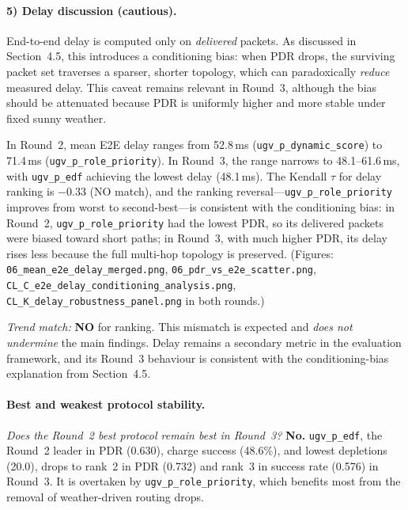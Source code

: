 \paragraph{5) Delay discussion (cautious).}

End-to-end delay is computed only on \emph{delivered} packets.  As
discussed in Section~4.5, this introduces a conditioning bias: when
PDR drops, the surviving packet set traverses a sparser, shorter
topology, which can paradoxically \emph{reduce} measured delay.  This
caveat remains relevant in Round~3, although the bias should be
attenuated because PDR is uniformly higher and more stable under
fixed sunny weather.

In Round~2, mean E2E delay ranges from 52.8\,ms
(\texttt{ugv\_p\_dynamic\_score}) to 71.4\,ms
(\texttt{ugv\_p\_role\_priority}).  In Round~3, the range narrows to
48.1--61.6\,ms, with \texttt{ugv\_p\_edf} achieving the lowest delay
(48.1\,ms).  The Kendall $\tau$ for delay ranking is $-0.33$ (NO
match), and the ranking reversal---\texttt{ugv\_p\_role\_priority}
improves from worst to second-best---is consistent with the
conditioning bias: in Round~2, \texttt{ugv\_p\_role\_priority} had
the lowest PDR, so its delivered packets were biased toward short
paths; in Round~3, with much higher PDR, its delay rises less because
the full multi-hop topology is preserved.
(Figures: \texttt{06\_mean\_e2e\_delay\_merged.png},
\texttt{06\_pdr\_vs\_e2e\_scatter.png},
\texttt{CL\_C\_e2e\_delay\_conditioning\_analysis.png},
\texttt{CL\_K\_delay\_robustness\_panel.png} in both rounds.)

\emph{Trend match:} \textbf{NO} for ranking.
This mismatch is expected and \emph{does not undermine} the main
findings.  Delay remains a secondary metric in the evaluation
framework, and its Round~3 behaviour is consistent with the
conditioning-bias explanation from Section~4.5.

\paragraph{Best and weakest protocol stability.}

\emph{Does the Round~2 best protocol remain best in Round~3?}
\textbf{No.}  \texttt{ugv\_p\_edf}, the Round~2 leader in PDR (0.630),
charge success (48.6\%), and lowest depletions (20.0), drops to rank~2
in PDR (0.732) and rank~3 in success rate (0.576) in Round~3.  It is
overtaken by \texttt{ugv\_p\_role\_priority}, which benefits most from
the removal of weather-driven routing drops.

